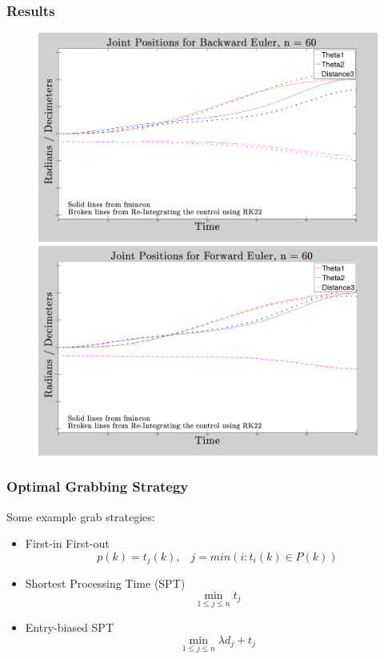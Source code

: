 \documentclass{beamer}
\begin{document}


\begin{frame}
\frametitle{Results}

\begin{figure}\centering
\includegraphics[width=0.53\columnwidth]{BakEul_n60}
\hspace{.025in}
\includegraphics[width=0.53\columnwidth]{ForEul_n60}
\end{figure}


\end{frame}



\begin{frame}
\frametitle{Optimal Grabbing Strategy}
Some example grab strategies:
\begin{itemize}
\item First-in First-out
$$ p(k) = t_j(k),\;\;\; j = min(i: t_i(k) \in P(k))     $$
\item Shortest Processing Time (SPT)
$$\min\limits_{1 \leq j \leq n} t_j$$
\item Entry-biased SPT
$$\min\limits_{1 \leq j \leq n} \lambda d_j + t_j$$

\end{itemize}
\end{frame}
\end{document}
